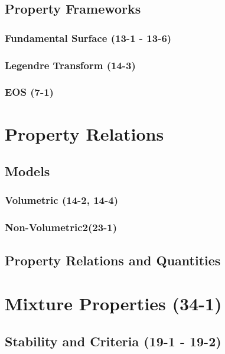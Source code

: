 \documentclass{mitqualif}
\begin{document}
\subsection{Property Frameworks}
\subsubsection{Fundamental Surface (13-1 - 13-6)}






\subsubsection{Legendre Transform (14-3)}

\subsubsection{EOS (7-1)}

\section{Property Relations}
\subsection{Models}
\subsubsection{Volumetric (14-2, 14-4)}






\subsubsection{Non-Volumetric2(23-1)}


\subsection{Property Relations and Quantities}
\section{Mixture Properties (34-1)}


\subsection{Stability and Criteria (19-1 - 19-2)}


\end{document}
